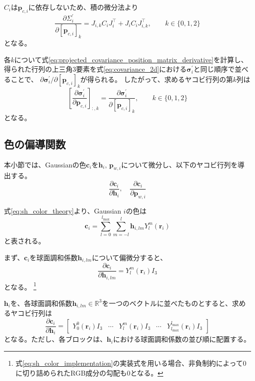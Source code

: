 \documentclass[dvipdfmx]{jlreq}
\begin{document}
$C_i$は$\bm{p}_{c,i}$に依存しないため、積の微分法より
\begin{equation}
    \frac{\partial\Sigma_i^{\prime}}{\partial[\bm{p}_{c,i}]_k} = J_{i,k}C_iJ_i^{\top} + J_iC_iJ_{i,k}^{\top}, \qquad k\in\{0,1,2\}
    \label{eq:projected_covariance_position_matrix_derivative}
\end{equation}
となる。

各$k$について式\eqref{eq:projected_covariance_position_matrix_derivative}を計算し、
得られた行列の上三角3要素を式\eqref{eq:covariance_2d}における$\bm{\sigma}_i^{\prime}$と同じ順序で並べることで、
$\partial\bm{\sigma}_i^{\prime}/\partial[\bm{p}_{c,i}]_k$が得られる。
したがって、求めるヤコビ行列の第$k$列は
\begin{equation}
    \left[\frac{\partial\bm{\sigma}_i^{\prime}}{\partial\bm{p}_{c,i}}\right]_{:,k} = \frac{\partial\bm{\sigma}_i^{\prime}}{\partial[\bm{p}_{c,i}]_k}, \qquad k\in\{0,1,2\}
    \label{eq:projected_covariance_position_jacobian}
\end{equation}
となる。

\subsection{色の偏導関数}
本小節では、Gaussianの色$\bm{c}_i$を$\bm{h}_i,\,\bm{p}_{w,i}$について微分し、以下のヤコビ行列を導出する。
\begin{equation*}
    \frac{\partial\bm{c}_i}{\partial\bm{h}_i}, \quad \frac{\partial\bm{c}_i}{\partial\bm{p}_{w,i}}
\end{equation*}

式\eqref{eq:sh_color_theory}より、Gaussian $i$の色は
\begin{equation}
    \bm{c}_i = \sum_{l=0}^{l_{\max}}\sum_{m=-l}^{l}\bm{h}_{i,lm}Y_l^m(\bm{r}_i)
    \label{eq:backward_sh_color}
\end{equation}
と表される。

まず、$\bm{c}_i$を球面調和係数$\bm{h}_{i,lm}$について偏微分すると、
\begin{equation}
    \frac{\partial\bm{c}_i}{\partial\bm{h}_{i,lm}} = Y_l^m(\bm{r}_i)I_3
    \label{eq:color_sh_component_jacobian}
\end{equation}
となる。
\footnote{式\eqref{eq:sh_color_implementation}の実装式を用いる場合、非負制約によって$0$に切り詰められたRGB成分の勾配も$0$となる。}

$\bm{h}_i$を、各球面調和係数$\bm{h}_{i,lm}\in\mathbb{R}^3$を一つのベクトルに並べたものとすると、求めるヤコビ行列は
\begin{equation}
    \frac{\partial\bm{c}_i}{\partial\bm{h}_i} =
    \begin{bmatrix}
        Y_0^0(\bm{r}_i)I_3 &
        \cdots &
        Y_l^m(\bm{r}_i)I_3 &
        \cdots &
        Y_{l_{\max}}^{l_{\max}}(\bm{r}_i)I_3
    \end{bmatrix}
    \label{eq:color_sh_coefficient_jacobian}
\end{equation}
となる。ただし、各ブロックは、$\bm{h}_i$における球面調和係数の並び順に配置する。
\end{document}
